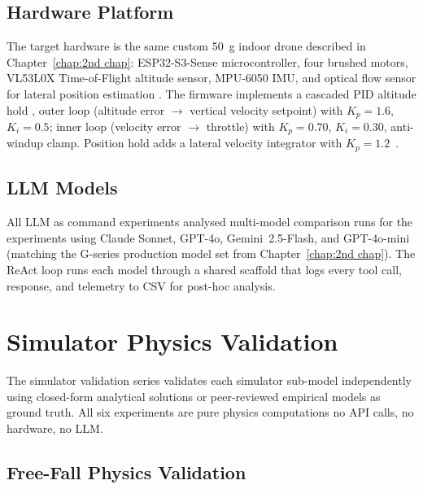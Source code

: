 \subsection{Hardware Platform}
\label{sec:ch3_setup_hw}

The target hardware is the same custom 50~g indoor drone described in
Chapter~\ref{chap:2nd chap}: ESP32-S3-Sense microcontroller, four brushed motors, VL53L0X Time-of-Flight altitude sensor, MPU-6050 IMU, and optical flow sensor for lateral position estimation \cite{grzonka2012indoor}. 
The firmware implements a cascaded PID altitude hold \cite{bouabdallah2004pid, narkhede2021althold}, outer loop (altitude error $\to$ vertical velocity setpoint) with $K_p=1.6$, $K_i=0.5$; inner loop (velocity error $\to$ throttle) with $K_p=0.70$, $K_i=0.30$, anti-windup clamp. 
Position hold adds a lateral velocity integrator with $K_p=1.2$~\cite{chadha2023poshold}.

\subsection{LLM Models}
\label{sec:ch3_setup_models}

All LLM as command experiments analysed multi-model comparison runs for the experiments using Claude Sonnet, GPT-4o, Gemini~2.5-Flash, and GPT-4o-mini (matching the G-series production model set from Chapter~\ref{chap:2nd chap}). 
The ReAct loop \cite{yao2022react} runs each model through a shared scaffold that logs every tool call, response, and telemetry to CSV for post-hoc analysis.


\section{Simulator Physics Validation}
\label{sec:ch3_aseries}

The simulator validation series validates each simulator sub-model independently using closed-form analytical solutions or peer-reviewed empirical models as ground truth.
All six experiments are pure physics computations no API calls, no
hardware, no LLM.

\subsection{Free-Fall Physics Validation}
\label{sec:ch3_a1}

